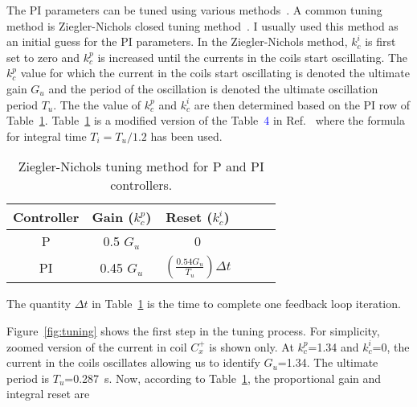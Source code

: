 The PI parameters can be tuned using various methods~\cite{tuning}. A common tuning method is Ziegler-Nichols closed tuning method~\cite{tuning_ZN}. I usually used this method as an initial guess for the PI parameters. In the Ziegler-Nichols method, $k_c^i$ is first set to zero and $k_c^p$ is increased until the currents in the coils start oscillating. The $k_c^p$ value for which the current in the coils start oscillating is denoted the ultimate gain $G_{u}$ and the period of the oscillation is denoted the ultimate oscillation period $T_u$. The the value of $k_c^p$ and $k_c^i$ are then determined based on the PI row of Table~\ref{table:tuning}. Table~\ref{table:tuning} is a modified version of the Table~\textcolor{blue}{4} in Ref.~\cite{tuning_formula} where the formula for integral time $T_i=T_u/1.2$ has been used. 

\begin{table} [htb!]
    \centering
    \begin{tabular} { |c|c|c|c|c|c|} 
        \hline
        Controller & Gain ($k_c^p$) & Reset ($k_c^i$)\\
        \hline\hline
         P & 0.5 $G_u$ & 0 \\ 
        \hline
         PI & 0.45 $G_u$ & $\left(\frac{\text{0.54} G_u}{T_u}\right)\Delta t$ \\ 
        \hline
    \end{tabular}
    \caption{Ziegler-Nichols tuning method for P and PI controllers.}\label{table:tuning}
\end{table}


The quantity $\Delta t$ in Table~\ref{table:tuning} is the time to complete one feedback loop iteration.

Figure~\ref{fig:tuning} shows the first step in the tuning process. For simplicity, zoomed version of the current in coil $C_x^+$ is shown only. At $k_c^p$=1.34 and $k_c^i$=0, the current in the coils oscillates allowing us to identify $G_u$=1.34.  The ultimate period is $T_u$=0.287~s. Now, according to Table~\ref{table:tuning}, the proportional gain and integral reset are

